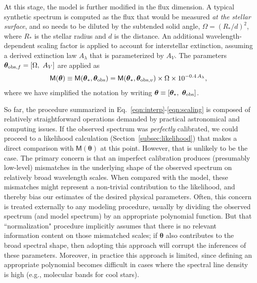 \documentclass[iop,floatfix]{emulateapj}
\newcommand{\vt}{ {\bm \theta}}
\newcommand{\vM}{\mathsf{M}}
\begin{document}
At this stage, the model is further modified in the flux dimension.  A typical synthetic spectrum 
is computed as the flux that would be measured {\it at the stellar surface}, and so needs to be 
diluted by the subtended solid angle, $\Omega = (R_{\ast}/d)^2$, where $R_{\ast}$ is the stellar 
radius and $d$ is the distance.  An additional wavelength-dependent scaling factor is applied to 
account for interstellar extinction, assuming a 
derived extinction law $A_{\lambda}$ \citep[e.g.,][]{cardelli89} that is parameterized by $A_V$.  
The parameters $\vt_{{\rm obs}, f} = [\Omega, \,\, A_V]$ are applied as
\begin{equation}
\vM(\vt) \equiv \vM(\vt_{\ast}, \vt_{\rm obs}) = \vM(\vt_{\ast}, \vt_{{\rm obs}, v}) \times \Omega \times 10^{-0.4\,A_{\lambda}},
\label{eqn:scaling}
\end{equation}
where we have simplified the notation by writing $\vt \equiv [\vt_{\ast}, \,\, \vt_{\rm obs}]$.

So far, the procedure summarized in Eq.~\ref{eqn:interp}-\ref{eqn:scaling} is composed of 
relatively straightforward operations demanded by practical astronomical and computing issues.  If 
the observed spectrum was {\it perfectly} calibrated, we could proceed to a likelihood calculation 
(Section~\ref{subsec:likelihood}) that makes a direct comparison with $\vM(\vt)$ at this point.  
However, that is unlikely to be the case.  The primary concern is that an imperfect calibration 
produces (presumably low-level) mismatches in the underlying shape of the observed spectrum on 
relatively broad wavelength scales.  When compared with the model, these mismatches might represent 
a non-trivial contribution to the likelihood, and thereby bias our estimates of the desired 
physical parameters.  Often, this concern is treated externally to any modeling procedure, usually 
by dividing the observed spectrum (and model spectrum) by an appropriate polynomial function.  But 
that ``normalization" procedure implicitly assumes that there is no relevant information content on 
those mismatched scales; if $\vt$ also contributes to the broad spectral shape, then adopting this 
approach will corrupt the inferences of these parameters.  Moreover, in practice this approach is 
limited, since defining an appropriate polynomial becomes difficult in cases where the spectral 
line density is high (e.g., molecular bands for cool stars).  
\end{document}
